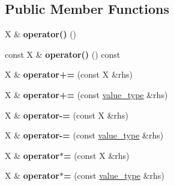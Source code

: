 \subsection*{Public Member Functions}
\begin{DoxyCompactItemize}
\item 
\hypertarget{classsimd_1_1simd__vector_a5dbe992b73255c783f3874b8a76a2402}{X \& {\bfseries operator()} ()}\label{classsimd_1_1simd__vector_a5dbe992b73255c783f3874b8a76a2402}

\item 
\hypertarget{classsimd_1_1simd__vector_ad26026a847ce9ed5bc4e7331bbc449fb}{const X \& {\bfseries operator()} () const }\label{classsimd_1_1simd__vector_ad26026a847ce9ed5bc4e7331bbc449fb}

\item 
\hypertarget{classsimd_1_1simd__vector_a03ece5c9cbdaeef16e9760b39f8ec544}{X \& {\bfseries operator+=} (const X \&rhs)}\label{classsimd_1_1simd__vector_a03ece5c9cbdaeef16e9760b39f8ec544}

\item 
\hypertarget{classsimd_1_1simd__vector_ac1ae04827457d6a37a99426d0cee084e}{X \& {\bfseries operator+=} (const \hyperlink{classsimd_1_1vector2d}{value\+\_\+type} \&rhs)}\label{classsimd_1_1simd__vector_ac1ae04827457d6a37a99426d0cee084e}

\item 
\hypertarget{classsimd_1_1simd__vector_a2306a521208a3fdc2974b7486fca3059}{X \& {\bfseries operator-\/=} (const X \&rhs)}\label{classsimd_1_1simd__vector_a2306a521208a3fdc2974b7486fca3059}

\item 
\hypertarget{classsimd_1_1simd__vector_a44a5f8b6938634cfb057e88f60c68390}{X \& {\bfseries operator-\/=} (const \hyperlink{classsimd_1_1vector2d}{value\+\_\+type} \&rhs)}\label{classsimd_1_1simd__vector_a44a5f8b6938634cfb057e88f60c68390}

\item 
\hypertarget{classsimd_1_1simd__vector_ad70ad90cf65dc43154e82319257552a2}{X \& {\bfseries operator$\ast$=} (const X \&rhs)}\label{classsimd_1_1simd__vector_ad70ad90cf65dc43154e82319257552a2}

\item 
\hypertarget{classsimd_1_1simd__vector_a82a89ea08333000a8f94228a48965d8e}{X \& {\bfseries operator$\ast$=} (const \hyperlink{classsimd_1_1vector2d}{value\+\_\+type} \&rhs)}\label{classsimd_1_1simd__vector_a82a89ea08333000a8f94228a48965d8e}


\end{DoxyCompactItemize}

